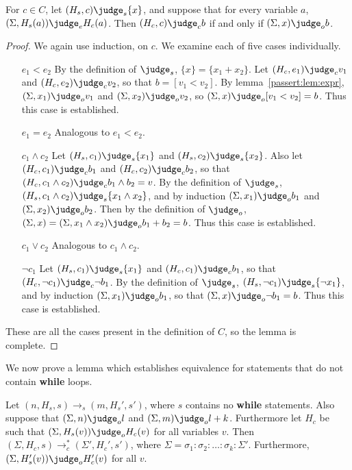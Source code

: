 \begin{lemma} \label{passert:lem:cond}
  For $c \in C$, let $(H_s, c) \judge_s \{ x \}$, and suppose that for
  every variable $a$, $(\Sigma, H_s(a)) \judge_e H_c(a)$.  Then $(H_c,
  c) \judge_c b$ if and only if $(\Sigma, x) \judge_o b$.
\end{lemma}

\begin{proof}
We again use induction, on $c$.  We examine each of five cases
individually.

\begin{itemize}
\item[$e_1 < e_2$] By the definition of $\judge_s$, $\{ x \} = \{ x_1
  + x_2 \}$.  Let $(H_c, e_1) \judge_c v_1$ and $(H_c, e_2) \judge_c
  v_2$, so that $b = [v_1 < v_2]$.  By lemma~\ref{passert:lem:expr}, $(\Sigma,
  x_1) \judge_o v_1$ and $(\Sigma, x_2) \judge_o v_2$, so $(\Sigma, x)
  \judge_o [v_1 < v_2] = b$.  Thus this case is established.
\item[$e_1 = e_2$] Analogous to $e_1 < e_2$.
\item[$c_1 \wedge c_2$] Let $(H_s, c_1) \judge_s \{ x_1 \}$ and $(H_s,
  c_2) \judge_s \{ x_2 \}$. Also let $(H_c, c_1) \judge_c b_1$ and
  $(H_c, c_2) \judge_c b_2$, so that $(H_c, c_1 \wedge c_2) \judge_c
  b_1 \wedge b_2 = v$.  By the definition of $\judge_s$, $(H_s, c_1
  \wedge c_2) \judge_s \{ x_1 \wedge x_2 \}$, and by induction
  $(\Sigma, x_1) \judge_o b_1$ and $(\Sigma, x_2) \judge_o b_2$.  Then
  by the definition of $\judge_o$, $(\Sigma, x) = (\Sigma, x_1 \wedge
  x_2) \judge_o b_1 + b_2 = b$.  Thus this case is established.
\item[$c_1 \vee c_2$] Analogous to $c_1 \wedge c_2$.
\item[$\neg c_1$] Let $(H_s, c_1) \judge_s \{ x_1 \}$ and $(H_c, c_1)
  \judge_c b_1$, so that $(H_c, \neg c_1) \judge_c \neg b_1$.  By the
  definition of $\judge_s$, $(H_s, \neg c_1) \judge_s \{ \neg x_1 \}$,
  and by induction $(\Sigma, x_1) \judge_o b_1$, so that $(\Sigma, x)
  \judge_o \neg b_1 = b$.  Thus this case is established.
\end{itemize}

These are all the cases present in the definition of $C$, so the lemma
is complete.

\end{proof}

We now prove a lemma which establishes equivalence for statements that
do not contain \textbf{while} loops.

\begin{lemma}
  \label{passert:lem:stmt}
  Let
  $(n, H_s, s) \to_s (m, H_s', s')$,
  where $s$ contains no \textbf{while} statements.
  Also suppose that $(\Sigma, n) \judge_o l$
  and $(\Sigma, m) \judge_o l + k$.
  Furthermore let $H_c$ be such that
  $(\Sigma, H_s(v)) \judge_o H_c(v)$
  for all variables $v$. Then
  $(\Sigma, H_c, s) \to_c^{*} (\Sigma', H_c', s')$,
  where
  $\Sigma = \sigma_1:\sigma_2:\dots:\sigma_k:\Sigma'$.
  Furthermore,
  $(\Sigma, H_s'(v)) \judge_o H_c'(v)$
  for all $v$.
\end{lemma}

